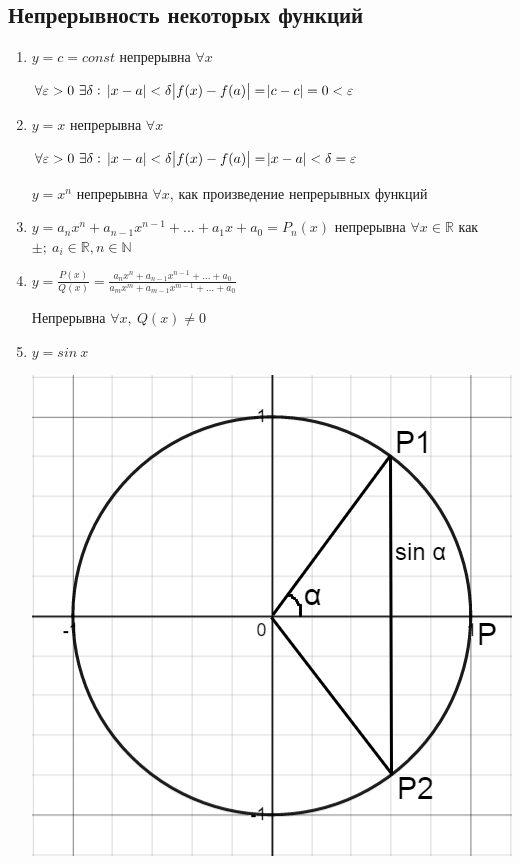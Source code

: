 \documentclass{article}
\begin{document}
    \subsection{Непрерывность некоторых функций}
    
    \begin{enumerate}
        \item \( y=c=const \) непрерывна \( \forall x \)
        
        \( \forall \varepsilon > 0\ \exists \delta:\ \abs{x - a} < \delta \abs{f(x) - f(a)} = \abs{c - c} = 0 < \varepsilon \)

        \item \(y=x\) непрерывна \(\forall x\)
        
        \(\forall \varepsilon > 0\ \exists \delta:\ \abs{x - a} < \delta \abs{f(x) - f(a)} = \abs{x - a} < \delta = \varepsilon\)
    
        \(y=x^n\) непрерывна \(\forall x\), как произведение непрерывных функций
        
        \item \(y = a_n x^n + a_{n-1}x^{n-1}+...+a_1x+a_0 = P_n(x)\) непрерывна \(\forall x \in \mathbb{R}\) как \(\pm;\ a_i \in \mathbb{R}, n \in \mathbb{N}\)
    
        \item \( y = \frac{P(x)}{Q(x)} = \frac{a_{n}x^{n} + a_{n - 1}x^{n - 1} + ... + a_0}{a_{m}x^{m} + a_{m - 1}x^{m - 1} + ... + a_0} \)
        
        Непрерывна \(\forall x,\ Q(x) \neq 0\)
            
        \item \(y = sin\ x\)

        \includegraphics[scale=0.35]{11_1_3_4.png}


\end{enumerate}
\end{document}
